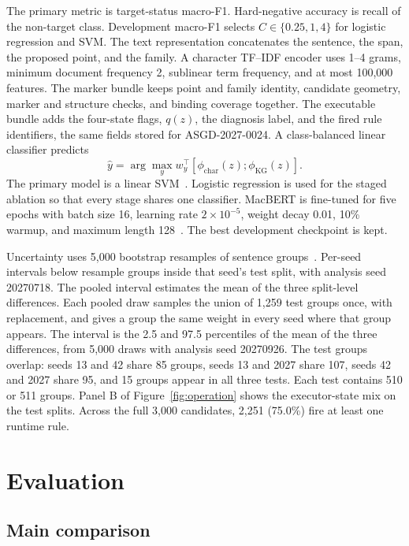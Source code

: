 \documentclass[pdflatex,sn-mathphys,NameDate]{sn-jnl}
\begin{document}
The primary metric is target-status macro-F1.
Hard-negative accuracy is recall of the non-target class.
Development macro-F1 selects $C\in\{0.25,1,4\}$ for logistic regression and SVM.
The text representation concatenates the sentence, the span, the proposed point, and the family.
A character TF--IDF encoder uses 1--4 grams, minimum document frequency 2, sublinear term frequency, and at most 100,000 features.
The marker bundle keeps point and family identity, candidate geometry, marker and structure checks, and binding coverage together.
The executable bundle adds the four-state flags, $q(z)$, the diagnosis label, and the fired rule identifiers, the same fields stored for ASGD-2027-0024.
A class-balanced linear classifier predicts
\begin{equation}
\hat{y}=\arg\max_{y} w_{y}^{\top}[\phi_{\mathrm{char}}(z);\phi_{\mathrm{KG}}(z)].
\label{eq:clf}
\end{equation}
The primary model is a linear SVM~\citep{cortes1995svm}.
Logistic regression is used for the staged ablation so that every stage shares one classifier.
MacBERT is fine-tuned for five epochs with batch size 16, learning rate $2\times10^{-5}$, weight decay 0.01, 10\% warmup, and maximum length 128~\citep{cui2020macbert}.
The best development checkpoint is kept.

Uncertainty uses 5,000 bootstrap resamples of sentence groups~\citep{koehn2004significance}.
Per-seed intervals below resample groups inside that seed's test split, with analysis seed 20270718.
The pooled interval estimates the mean of the three split-level differences.
Each pooled draw samples the union of 1,259 test groups once, with replacement, and gives a group the same weight in every seed where that group appears.
The interval is the 2.5 and 97.5 percentiles of the mean of the three differences, from 5,000 draws with analysis seed 20270926.
The test groups overlap: seeds 13 and 42 share 85 groups, seeds 13 and 2027 share 107, seeds 42 and 2027 share 95, and 15 groups appear in all three tests.
Each test contains 510 or 511 groups.
Panel B of Figure~\ref{fig:operation} shows the executor-state mix on the test splits.
Across the full 3,000 candidates, 2,251 (75.0\%) fire at least one runtime rule.

\section{Evaluation}
\label{sec:eval}

\subsection{Main comparison}
\end{document}
